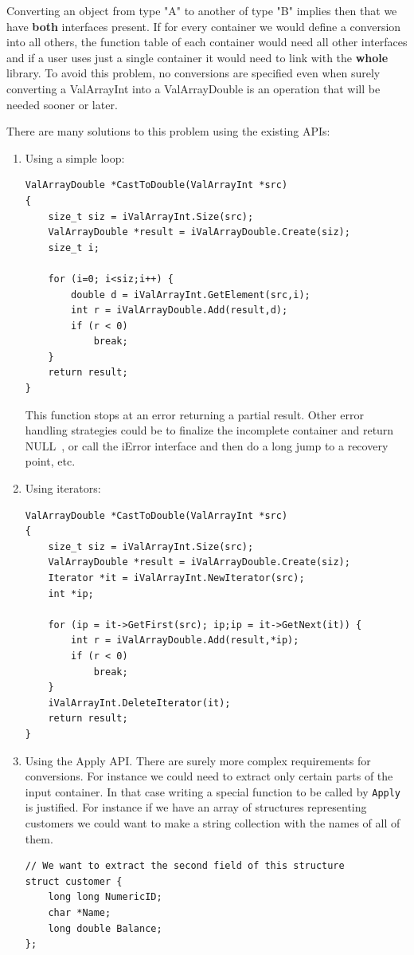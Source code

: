 \documentclass[12pt,a4paper,openany]{memoir} %
\newif\iftth
\newcommand{\Null}{{\iftth \ NULL \else \footnotesize NULL\  \fi}}
\begin{document}
{{Converting an object from type "A" to another of type "B" implies then that we have \textbf{both} interfaces present. If for every container
we would define a conversion into all others, the function table of each container would need all other interfaces and if a user uses just
a single container it would need to link with the \textbf{whole} library. To avoid this problem, no conversions are specified even when surely
converting a ValArrayInt into a ValArrayDouble is an operation that will be needed sooner or later.

There are many solutions to this problem using the existing APIs:
\begin{enumerate}
\item Using a simple loop:
\begin{verbatim}
ValArrayDouble *CastToDouble(ValArrayInt *src)
{
    size_t siz = iValArrayInt.Size(src);
    ValArrayDouble *result = iValArrayDouble.Create(siz);
    size_t i;

    for (i=0; i<siz;i++) {
        double d = iValArrayInt.GetElement(src,i);
        int r = iValArrayDouble.Add(result,d);
        if (r < 0)
            break;
    }
    return result;
}
\end{verbatim}
This function stops at an error returning a partial result. Other error handling strategies could be to finalize the 
incomplete container and return \Null, or call the iError interface and then do a long jump to a recovery point, etc.
\item Using iterators:
\begin{verbatim}
ValArrayDouble *CastToDouble(ValArrayInt *src)
{
    size_t siz = iValArrayInt.Size(src);
    ValArrayDouble *result = iValArrayDouble.Create(siz);
    Iterator *it = iValArrayInt.NewIterator(src);
    int *ip;

    for (ip = it->GetFirst(src); ip;ip = it->GetNext(it)) {
        int r = iValArrayDouble.Add(result,*ip);
        if (r < 0)
            break;
    }
    iValArrayInt.DeleteIterator(it);
    return result;
}
\end{verbatim}
\item Using the Apply API.
There are surely more complex requirements for conversions. For instance we could need to extract only certain parts of the input 
container. In that case
writing a special function to be called by \verb,Apply, is justified. For instance if we have an array of structures representing customers
we could want to make a string collection with the names of all of them. 
\begin{verbatim}
// We want to extract the second field of this structure
struct customer {
    long long NumericID;
    char *Name;
    long double Balance;
};


\end{verbatim}
\end{enumerate}}}
\end{document}
